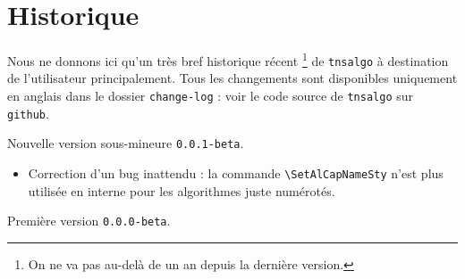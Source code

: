 \documentclass[12pt,a4paper]{article}
\begin{document}
\newpage

\section{Historique}

Nous ne donnons ici qu'un très bref historique récent
\footnote{
	On ne va pas au-delà de un an depuis la dernière version.
}
de \verb+tnsalgo+ à destination de l'utilisateur principalement.
Tous les changements sont disponibles uniquement en anglais dans le dossier \verb+change-log+ : voir le code source de \verb+tnsalgo+ sur \verb+github+.

\begin{description}

    \medskip
    \item[2020-10-22] Nouvelle version sous-mineure \verb+0.0.1-beta+.
    
    \begin{itemize}[itemsep=.5em]
        \item Correction d'un bug inattendu : la commande \verb#\SetAlCapNameSty# n'est plus utilisée en interne pour les algorithmes juste numérotés.
    
    
    \end{itemize}
    
    \separation
    


    \medskip
    \item[2020-09-12] Première version \verb+0.0.0-beta+.


\end{description}
\end{document}
